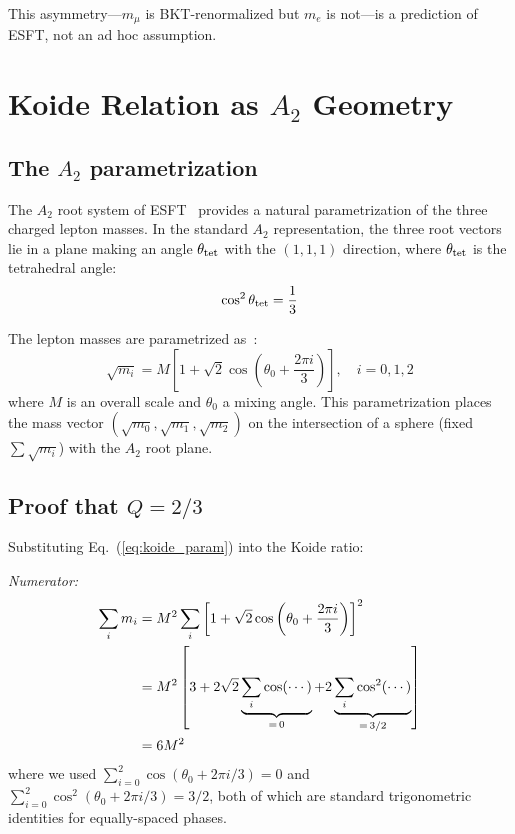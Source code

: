 ﻿\documentclass[twocolumn,preprintnumbers,amsmath,amssymb]{revtex4-2}
\begin{document}
This asymmetry---$m_\mu$ is BKT-renormalized but $m_e$ is not---is a prediction of ESFT, not an ad hoc assumption.

\section{Koide Relation as $A_2$ Geometry}
\label{sec:koide}

\subsection{The $A_2$ parametrization}

The $A_2$ root system of ESFT~\cite{Paper2} provides a natural parametrization of the three charged lepton masses. In the standard $A_2$ representation, the three root vectors lie in a plane making an angle $\theta_{\rm tet}$ with the $(1,1,1)$ direction, where $\theta_{\rm tet}$ is the tetrahedral angle:
\begin{equation}
\cos^2\theta_{\rm tet} = \frac{1}{3}
\label{eq:tet_angle}
\end{equation}

The lepton masses are parametrized as~\cite{Koide1983}:
\begin{equation}
\sqrt{m_i} = M\left[1 + \sqrt{2}\cos\left(\theta_0 + \frac{2\pi i}{3}\right)\right], \quad i = 0,1,2
\label{eq:koide_param}
\end{equation}
where $M$ is an overall scale and $\theta_0$ a mixing angle. This parametrization places the mass vector $(\sqrt{m_0}, \sqrt{m_1}, \sqrt{m_2})$ on the intersection of a sphere (fixed $\sum\sqrt{m_i}$) with the $A_2$ root plane.

\subsection{Proof that $Q = 2/3$}

Substituting Eq.~(\ref{eq:koide_param}) into the Koide ratio:

\textit{Numerator:}
\begin{align}
\sum_i m_i &= M^2 \sum_i \left[1 + \sqrt{2}\cos\left(\theta_0 + \frac{2\pi i}{3}\right)\right]^2 \notag \\
&= M^2\left[3 + 2\sqrt{2}\underbrace{\sum_i \cos(\cdots)}_{=\,0} + 2\underbrace{\sum_i \cos^2(\cdots)}_{=\,3/2}\right] \notag \\
&= 6M^2
\label{eq:numerator}
\end{align}
where we used $\sum_{i=0}^{2}\cos(\theta_0 + 2\pi i/3) = 0$ and $\sum_{i=0}^{2}\cos^2(\theta_0 + 2\pi i/3) = 3/2$, both of which are standard trigonometric identities for equally-spaced phases.
\end{document}
